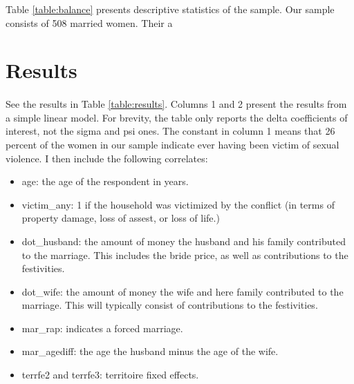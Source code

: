 \documentclass[11pt,a4paper]{scrartcl} %
\begin{document}
Table \ref{table:balance} presents descriptive statistics of the sample. Our sample consists of 508 married women. Their a

\begin{table}
	\label{table:balance}
	\begin{center}
	
	\end{center}
\end{table}







\section*{Results}
\paragraph{}
See the results in Table \ref{table:results}. Columns 1 and 2 present the results from a simple linear model. For brevity, the table only reports the delta coefficients of interest, not the sigma and psi ones. The constant in column 1 means that 26 percent of the women in our sample indicate ever having been victim of sexual violence. 
I then include the following correlates:
\begin{itemize}
	\item age: the age of the respondent in years.
	\item victim\_any: 1 if the household was victimized by the conflict (in terms of property damage, loss of assest, or loss of life.)
	\item dot\_husband: the amount of money the husband and his family contributed to the marriage. This includes the bride price, as well as contributions to the festivities.
	\item dot\_wife: the amount of money  the wife and here family contributed to the marriage. This will typically consist of contributions to the festivities.
	\item mar\_rap: indicates a forced marriage.
	\item mar\_agediff: the age the husband minus the age of the wife.
	\item terrfe2 and terrfe3: territoire fixed effects.
\end{itemize}
\end{document}
